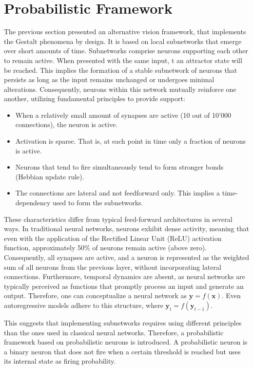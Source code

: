 \section{Probabilistic Framework}
The previous section presented an alternative vision framework, that implements the Gestalt phenomena by design. It is based on local subnetworks that emerge over short amounts of time. Subnetworks comprise neurons supporting each other to remain active.
When presented with the same input, t an attractor state will be reached. This implies the formation of a stable subnetwork of neurons that persists as long as the input remains unchanged or undergoes minimal alterations. Consequently, neurons within this network mutually reinforce one another, utilizing fundamental principles to provide support:

\begin{itemize}
    \item When a relatively small amount of synapses are active (10 out of 10'000 connections), the neuron is active. 
    \item Activation is sparse. That is, at each point in time only a fraction of neurons is active.
    \item Neurons that tend to fire simultaneously tend to form stronger bonds (Hebbian update rule).
    \item The connections are lateral and not feedforward only. This implies a time-dependency used to form the subnetworks. 
\end{itemize}

These characteristics differ from typical feed-forward architectures in several ways.  In traditional neural networks, neurons exhibit dense activity, meaning that even with the application of the Rectified Linear Unit (ReLU) activation function, approximately 50\% of neurons remain active (above zero). Consequently, all synapses are active, and a neuron is represented as the weighted sum of all neurons from the previous layer, without incorporating lateral connections. Furthermore, temporal dynamics are absent, as neural networks are typically perceived as functions that promptly process an input and generate an output. Therefore, one can conceptualize a neural network as $\boldsymbol{y} = f(\boldsymbol{x})$. Even autoregressive models adhere to this structure, where $\boldsymbol{y}_t = f(\boldsymbol{y}_{t-1})$.

This suggests that implementing subnetworks requires using different principles than the ones used in classical neural networks. Therefore, a probabilistic framework based on probabilistic neurons is introduced.
A probabilistic neuron is a binary neuron that does not fire when a certain threshold is reached but uses its internal state as firing probability.

